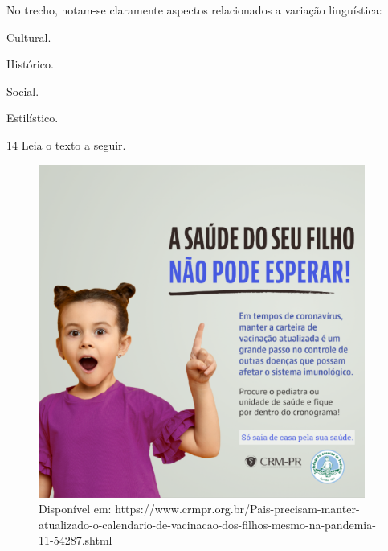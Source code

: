 \noindent No trecho, notam-se claramente aspectos relacionados a variação
linguística:

\begin{escolha}
\item Cultural.
\item Histórico.
\item Social.
\item Estilístico.
\end{escolha}



\num{14} Leia o texto a seguir.

\begin{figure}[H]
\centering\includegraphics[width=4.23378in,height=4.3141in]{./imgSAEB_6_POR/media/image36.png}
\caption{Disponível em: https://www.crmpr.org.br/Pais-precisam-manter-atualizado-o-calendario-de-vacinacao-dos-filhos-mesmo-na-pandemia-11-54287.shtml}
\end{figure}

